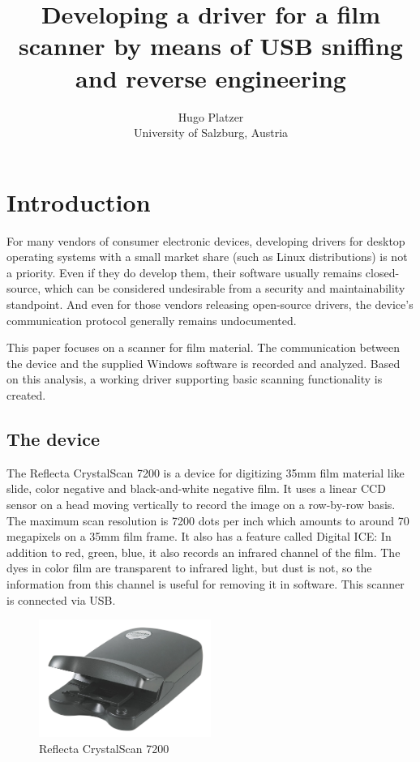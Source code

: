\documentclass{article}
\begin{document}
\title{Developing a driver for a film scanner by means of USB sniffing and reverse engineering}
\author{Hugo Platzer \\ University of Salzburg, Austria}
\maketitle

\section{Introduction}

For many vendors of consumer electronic devices,
developing drivers for desktop operating systems
with a small market share (such as Linux distributions) is not a priority. Even if
they do develop them, their software usually remains closed-source, which can be considered undesirable from a security and maintainability standpoint. And even for those
vendors releasing open-source drivers, the device's communication protocol generally remains
undocumented.

This paper focuses on a scanner for film material. The communication between the
device and the supplied Windows software is recorded and analyzed. Based on this analysis,
a working driver supporting basic scanning functionality is created.

\subsection{The device}

The Reflecta CrystalScan 7200 is a device for digitizing 35mm film material like
slide, color negative and black-and-white negative film.
It uses a linear CCD sensor on a head moving vertically to record the image on a row-by-row basis.
The maximum scan resolution is 7200 dots per inch which amounts to around 70 megapixels
on a 35mm film frame. It also has a feature called Digital ICE: In addition to red, green, blue, it also
records an infrared channel of the film. The dyes in color film are transparent to infrared light,
but dust is not, so the information from this channel is useful for removing it in software.
This scanner is connected via USB. \cite{rcs} \cite{rcs_review}

\begin{figure}[!htbp]
  \caption{Reflecta CrystalScan 7200}
  \centering
  \includegraphics[width=0.5\textwidth]{images/presentation/the_scanner.jpg}
\end{figure}
\end{document}
